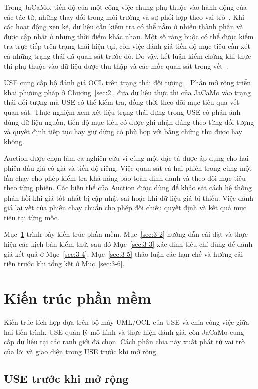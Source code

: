 \documentclass[12pt,a4paper,oneside]{extreport}
\begin{document}
Trong JaCaMo, tiến độ của một công việc chung phụ thuộc vào hành động của các tác tử, những thay đổi trong môi trường và sự phối hợp theo vai trò~\cite{ref-2}. Khi các hoạt động xen kẽ, dữ liệu cần kiểm tra có thể nằm ở nhiều thành phần và được cập nhật ở những thời điểm khác nhau. Một số ràng buộc có thể được kiểm tra trực tiếp trên trạng thái hiện tại, còn việc đánh giá tiến độ mục tiêu cần xét cả những trạng thái đã quan sát trước đó. Do vậy, kết luận kiểm chứng khi thực thi phụ thuộc vào dữ liệu được thu thập và các mốc quan sát trong vết~\cite{ref-5}.

USE cung cấp bộ đánh giá OCL trên trạng thái đối tượng~\cite{ref-4}. Phần mở rộng triển khai phương pháp ở Chương~\ref{sec:2}, đưa dữ liệu thực thi của JaCaMo vào trạng thái đối tượng mà USE có thể kiểm tra, đồng thời theo dõi mục tiêu qua vết quan sát. Thực nghiệm xem xét liệu trạng thái dựng trong USE có phản ánh đúng dữ liệu nguồn, tiến độ mục tiêu có được ghi nhận đúng theo từng đối tượng và quyết định tiếp tục hay giữ dừng có phù hợp với bằng chứng thu được hay không.

Auction được chọn làm ca nghiên cứu vì cùng một đặc tả được áp dụng cho hai phiên đấu giá có giá và tiến độ riêng. Việc quan sát cả hai phiên trong cùng một lần chạy cho phép kiểm tra khả năng bảo toàn định danh và theo dõi mục tiêu theo từng phiên. Các biến thể của Auction được dùng để khảo sát cách hệ thống phản hồi khi giá tốt nhất bị cập nhật sai hoặc khi dữ liệu giá bị thiếu. Việc đánh giá lại vết của phiên chạy chuẩn cho phép đối chiếu quyết định và kết quả mục tiêu tại từng mốc.

Mục~\ref{sec:3-1} trình bày kiến trúc phần mềm. Mục~\ref{sec:3-2} hướng dẫn cài đặt và thực hiện các kịch bản kiểm thử, sau đó Mục~\ref{sec:3-3} xác định tiêu chí dùng để đánh giá kết quả ở Mục~\ref{sec:3-4}. Mục~\ref{sec:3-5} thảo luận các hạn chế và hướng cải tiến trước khi tổng kết ở Mục~\ref{sec:3-6}.

\section{Kiến trúc phần mềm}\label{sec:3-1}

Kiến trúc tích hợp dựa trên bộ máy UML/OCL của USE và chia công việc giữa hai tiến trình. USE quản lý mô hình và thực hiện đánh giá, còn JaCaMo cung cấp dữ liệu tại các ranh giới đã chọn. Cách phân chia này xuất phát từ vai trò của lõi và giao diện trong USE trước khi mở rộng.

\subsection{USE trước khi mở rộng}\label{sec:3-1-1}
\end{document}

